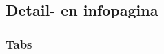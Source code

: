 \subsection{Detail- en infopagina}
\label{sec:detaileninfopagina}

\subsubsection{Tabs}
\label{sec:detaileninfopaginatabs}